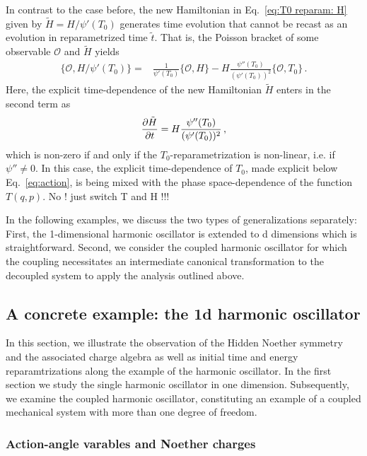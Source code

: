 \documentclass[onecolumn,notitlepage,superscriptaddress, nofootinbib,nobibnotes, aps,prd,10pt]{revtex4-1}%
\begin{document}
In contrast to the case before, the new Hamiltonian in Eq.~\eqref{eq:T0 reparam: H} given by $\tilde{H} = H/\psi'(T_0)$ generates time evolution that cannot be recast as an evolution in reparametrized time $\tilde{t}$. That is, the Poisson bracket of some observable $\mathcal{O}$ and $\tilde{H}$ yields
%
\begin{equation}
\begin{aligned}
\{\mathcal{O},H/\psi'(T_0)\} =& \frac{1}{\psi'(T_0)}\{\mathcal{O},H\}-H\frac{\psi''(T_0)}{(\psi'(T_0))^2}\{\mathcal{O},T_0\}\, .
\end{aligned}
\end{equation}
%
Here, the explicit time-dependence of the new Hamiltonian $\tilde{H}$ enters in the second term as
%
\begin{equation}
\pdv{\tilde{H}}{t} = H\frac{\psi''(T_0)}{(\psi'(T_0))^2}\, ,
\end{equation}
%
which is non-zero if and only if the $T_0$-reparametrization is non-linear, i.e. if $\psi''\neq 0$. In this case, the explicit time-dependence of $T_0$, made explicit below Eq.~\eqref{eq:action}, is being mixed with the phase space-dependence of the function $T(q,p)$.   No ! just switch T and H !!!


In the following examples, we discuss the two types of generalizations separately: First, the 1-dimensional harmonic oscillator is extended to d dimensions which is straightforward. Second, we consider the coupled harmonic oscillator for which the coupling necessitates an intermediate canonical transformation to the decoupled system to apply the analysis outlined above. 


\subsection{A concrete example: the 1d harmonic oscillator}\label{sec:Example}

In this section, we illustrate the observation of the Hidden Noether symmetry and the associated charge algebra as well as initial time and energy reparamtrizations along the example of the harmonic oscillator. In the first section we study the single harmonic oscillator in one dimension. Subsequently, we examine the coupled harmonic oscillator, constituting an example of a coupled mechanical system with more than one degree of freedom.

\subsubsection{Action-angle varables and Noether charges}\label{sec:1D HO}
\end{document}
